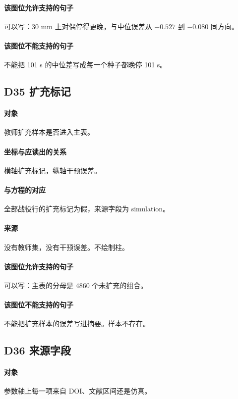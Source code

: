 \paragraph{该图位允许支持的句子}
可以写：30 mm 上对偶停得更晚，与中位误差从 $-0.527$ 到 $-0.080$ 同方向。

\paragraph{该图位不能支持的句子}
不能把 101 s 的中位差写成每一个种子都晚停 101 s。

\subsection{D35 扩充标记}
\paragraph{对象}
教师扩充样本是否进入主表。

\paragraph{坐标与应读出的关系}
横轴扩充标记，纵轴干预误差。

\paragraph{与方程的对应}
全部战役行的扩充标记为假，来源字段为 simulation。

\paragraph{来源}
没有教师集，没有干预误差。不绘制柱。

\paragraph{该图位允许支持的句子}
可以写：主表的分母是 4860 个未扩充的组合。

\paragraph{该图位不能支持的句子}
不能把扩充样本的误差写进摘要。样本不存在。

\subsection{D36 来源字段}
\paragraph{对象}
参数轴上每一项来自 DOI、文献区间还是仿真。

